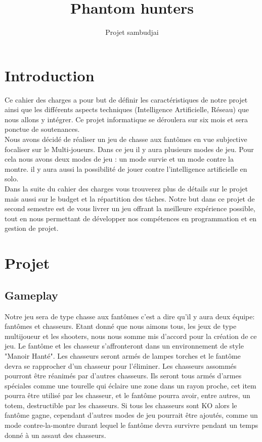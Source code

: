 \documentclass[10pt]{article} %
\title{\Huge Phantom hunters}
\author{Projet sambudjai}
\begin{document}
\maketitle

\newpage

\tableofcontents

\newpage

\section{Introduction}


Ce cahier des charges a pour but de définir les caractéristiques de notre projet ainsi que les différents aspects techniques (Intelligence Artificielle, Réseau) que nous allons y intégrer. Ce projet informatique se déroulera sur six mois et sera ponctue de soutenances.\\

Nous avons décidé de réaliser un jeu de chasse aux fantômes en vue subjective focaliser sur le 
 Multi-joueurs. Dans ce jeu il y aura plusieurs modes de jeu. Pour cela nous avons deux modes de jeu : un mode survie et un mode contre la montre.
il y aura aussi la possibilité de jouer contre l'intelligence artificielle en solo. \\

Dans la suite du cahier des charges vous trouverez plus de détails sur le projet mais aussi sur le budget et la répartition des tâches.
Notre but dans ce projet de second semestre est de vous livrer un jeu offrant la meilleure expérience possible, tout en nous permettant de développer nos compétences en programmation et en gestion de projet.
\newpage


\section{Projet}



\subsection{Gameplay}

Notre jeu sera de type chasse aux fantômes c'est a dire qu'il y aura deux équipe: fantômes et chasseurs.
Etant donné que nous aimons tous, les jeux de type multijoueur et les shooters, nous  nous somme mis d'accord pour la création de ce jeu.
Le fantôme et les chasseur s'affronteront dans un environnement de style "Manoir Hanté". Les chasseurs seront armés de lampes torches et le fantôme devra se rapprocher d'un chasseur pour l'éliminer. Les chasseurs assommés pourront être réanimés par d'autres chasseurs.
Ils seront tous armés d'armes spéciales comme une tourelle qui éclaire une zone dans un rayon proche, cet item pourra être utilisé par les chasseur, et le fantôme pourra avoir, entre autres, un totem, destructible par les chasseurs.      
Si tous les chasseurs sont KO alors le fantôme gagne, cependant d'autres modes de jeu pourrait être ajoutés, comme un mode contre-la-montre durant lequel le fantôme devra survivre pendant un temps donné à un assaut des chasseurs.
\end{document}
